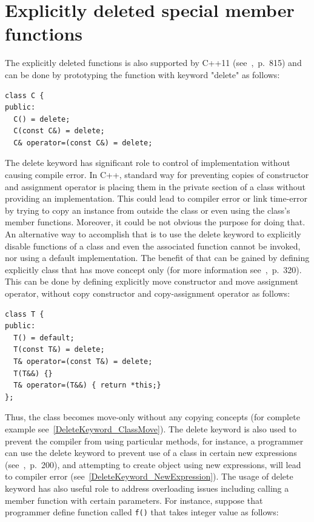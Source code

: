 \documentclass[11pt]{report}
\begin{document}
\section{Explicitly deleted special member functions}
\label{section: Deleted special member functions}
The explicitly deleted functions is also supported by C++11 (see~\cite{Horstmann:2008:BC},~p.~815) and can be done by prototyping the function with keyword "delete" as follows:
\begin{lstlisting}
class C {
public:
  C() = delete; 
  C(const C&) = delete; 
  C& operator=(const C&) = delete;
\end{lstlisting}
The delete keyword has significant role to control of implementation without causing compile error. In C++, standard way for preventing copies of constructor and assignment operator is placing them in the private section of a class without providing an implementation. This could lead to compiler error or link time-error by trying to copy an instance from outside the class or even using the class's member functions. Moreover, it could be not obvious the purpose for doing that. An alternative way to accomplish that is to use the delete keyword to explicitly disable functions of a class and even the associated function cannot be invoked, nor using a default implementation. The benefit of that can be gained by defining explicitly class that has move concept only (for more information see~\cite{Williams:2012:CCA},~p.~320). This can be done by defining explicitly move constructor and move assignment operator, without copy constructor and copy-assignment operator as follows:
\begin{lstlisting}
class T {
public:
  T() = default;
  T(const T&) = delete;
  T& operator=(const T&) = delete;
  T(T&&) {}
  T& operator=(T&&) { return *this;}
};
\end{lstlisting}
Thus, the class becomes move-only without any copying concepts (for complete example see~\ref{DeleteKeyword_ClassMove}). The delete keyword is also used to prevent the compiler from using particular methods, for instance, a programmer can use the delete keyword to prevent use of a class in certain new expressions (see~\cite{ISO:2011:Cpplanguage},~p.~200), and attempting to create object using new expressions, will lead to compiler error (see~\ref{DeleteKeyword_NewExpression}). The usage of delete keyword has also useful role to address overloading issues including calling a member function with certain parameters. For instance, suppose that programmer define function called \texttt{f()} that takes integer value as follows:
\end{document}
